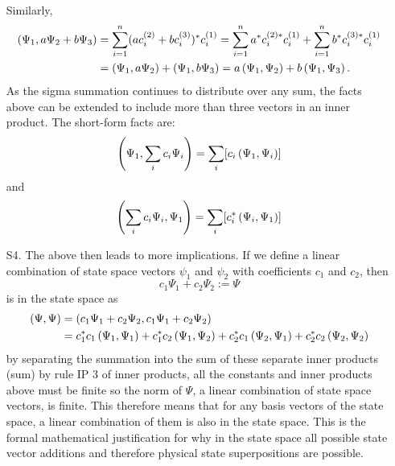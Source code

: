 \begin{enumerate}
$$\begin{aligned}
    \end{aligned}
    $$
    Similarly,
    $$
    \begin{aligned}
    \left(\Psi_{1},a\Psi_{2}+b\Psi_{3}\right)&=\sum_{i=1}^{n}(ac^{(2)}_{i}+bc^{(3)}_{i})^{\ast}c^{(1)}_{i}=\sum_{i=1}^{n}a^{\ast}c^{(2)\ast}_{i}c^{(1)}_{i}+\sum_{i=1}^{n}b^{\ast}c^{(3)\ast}_{i}c^{(1)}_{i}\\
    &=\left(\Psi_{1},a\Psi_{2}\right)+\left(\Psi_{1},b\Psi_{3}\right)=a\left(\Psi_{1},\Psi_{2}\right)+b\left(\Psi_{1},\Psi_{3}\right).
    \end{aligned}
    $$
    As the sigma summation continues to distribute over any sum, the facts above can be extended to include more than three vectors in an inner product. The short-form facts are:
    $$
    \left(\Psi_{1},\sum_{i} c_{i}\Psi_{i}\right)=\sum_{i}[c_{i}\left(\Psi_{1},\Psi_{i}\right)]
    $$
    and
    $$
    \left(\sum_{i} c_{i}\Psi_{i},\Psi_{1}\right)=\sum_{i}[c_{i}^{\ast}\left(\Psi_{i},\Psi_{1}\right)]
    $$
    \item[S4.] The above then leads to more implications. If we define a linear combination of state space vectors $\psi_{1}$ and $\psi_{2}$ with coefficients $c_{1}$ and $c_{2}$, then 
    $$
    c_{1}\Psi_{1}+c_{2}\Psi_{2}:=\Psi
    $$
    is in the state space as 
    $$
    \begin{aligned}
    \left(\Psi,\Psi\right)&=\left(c_{1}\Psi_{1}+c_{2}\Psi_{2},c_{1}\Psi_{1}+c_{2}\Psi_{2}\right)\\
    &=c_{1}^{\ast}c_{1}\left(\Psi_{1},\Psi_{1}\right)+c_{1}^{\ast}c_{2}\left(\Psi_{1},\Psi_{2}\right)+c_{2}^{\ast}c_{1}\left(\Psi_{2},\Psi_{1}\right)+ c_{2}^{\ast}c_{2}\left(\Psi_{2},\Psi_{2}\right)
    \end{aligned}
    $$
    by separating the summation into the sum of these separate inner products (sum) by rule IP 3 of inner products,
    all the constants and inner products above must be finite so the norm of $\Psi$, a linear combination of state space vectors, is finite. This therefore means that for any basis vectors of the state space, a linear combination of them is also in the state space. This is the formal mathematical justification for why in the state space all possible state vector additions and therefore physical state superpositions are possible.
    \end{enumerate}
